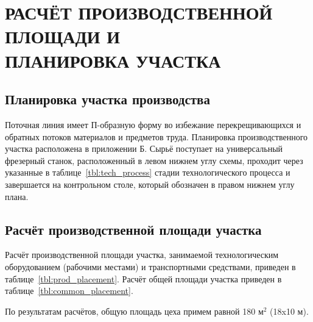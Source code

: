 \section[%
Расчёт производственной площади и планировка участка]{%
РАСЧЁТ ПРОИЗВОДСТВЕННОЙ ПЛОЩАДИ И \\
ПЛАНИРОВКА УЧАСТКА
}
\label{sec:placement}

\subsection{Планировка участка производства}

Поточная линия имеет П-образную форму во избежание перекрещивающихся и
обратных потоков материалов и предметов труда.
Планировка производственного участка расположена в приложении Б.
Сырьё поступает на универсальный фрезерный станок, 
расположенный в  левом нижнем углу схемы, 
проходит через указанные в таблице~\ref{tbl:tech_process} стадии
технологического процесса и завершается на контрольном столе,
который обозначен в правом нижнем углу плана.

\subsection{Расчёт производственной площади участка}

Расчёт производственной площади участка, занимаемой технологическим оборудованием
(рабочими местами) и транспортными средствами, 
приведен в таблице~\ref{tbl:prod_placement}.
Расчёт общей площади участка приведен в таблице~\ref{tbl:common_placement}.

По результатам расчётов, общую площадь цеха примем равной
180 \( \text{м}^2 \) (18x10 м).

